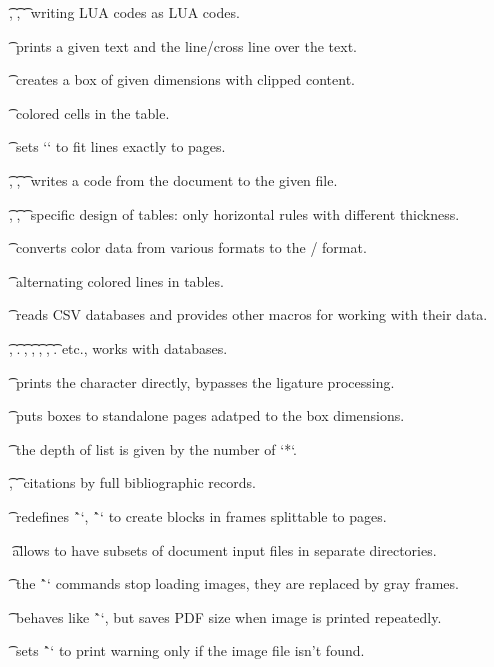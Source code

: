 {{\tpg[beglua]\t\beglua, \t\begLUA, \t\logginglua\ writing LUA codes as LUA codes.

\tpg[cancel]\t\cancel\ prints a given text and the line/cross line over the text.

\tpg[clipbox]\t\clipbox\ creates a box of given dimensions with clipped content.

\tpg[colortab]\t{}\
colored cells in the table.

\tpg[correctvsize]\t\correctvsize\
sets `\vsize` to fit lines exactly to pages.

\tpg[begfile]\t\createfile, \t\begfile, \t\endfile\
writes a code from the document to the given file.

\tpg[booktabs]\t\crtop, \t\crmid, \t\crbot\
specific design of tables: only horizontal rules with different thickness.

\tpg[ccd]\t\ccd\
converts color data from various formats to the \OpTeX/ format.

\tpg[colorlin]\t\crx\
alternating colored lines in tables.

\tpg[csvread]\t\csvread\
reads CSV databases and provides other macros for working with their data.

\tpg[csvread]\t\dbitem, \tpg[dbwhere]\t\dbwhere. \tpg[dbloop]\t\dbloop, \t\dbsort,
\tpg[dbcreate]\t\dbcreate, \t\dbinsert, \tpg[dbshow]\t\dbshow. etc.,
works with databases.

\tpg[directchar]\t\directchar\
prints the character directly, bypasses the ligature processing.

\tpg[directoutput]\t\directoutput\
puts boxes to standalone pages adatped to the box dimensions.

\tpg[easylist]\t\easylist\
the depth of list is given by the number of `*`.

\tpg[fullcite]\t\fcread, \t\fullcite\
citations by full bibliographic records.

\tpg[greyblock]\t\framedblocks\
redefines \^`\begblock`, \^`\endblock` to create blocks in frames splittable to pages.

\tpg[import]\t\
allows to have subsets of document input files in separate directories.

\tpg[inspicignore]\t\inspicignore\
the \^`\inspic` commands stop loading images, they are replaced by gray frames.

\tpg[inspicto]\t\inspicto\
behaves like \^`\inspic`, but saves PDF size when image is printed repeatedly.

\tpg[inspicwarn]\t\inspicwarn\
sets \^`\inspic` to print warning only if the image file isn't found.

}}
